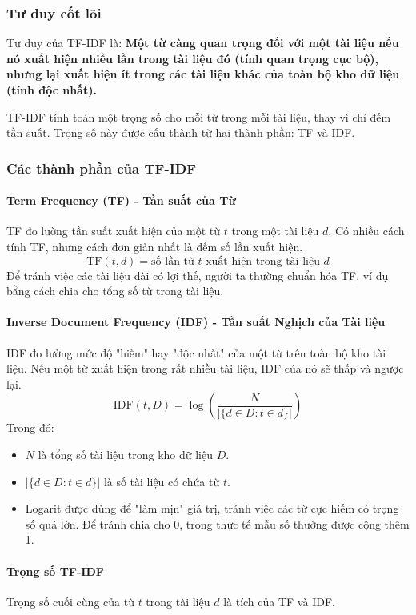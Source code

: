 \subsubsection{Tư duy cốt lõi}

Tư duy của TF-IDF là: \textbf{Một từ càng quan trọng đối với một tài liệu nếu nó xuất hiện nhiều lần trong tài liệu đó (tính quan trọng cục bộ), nhưng lại xuất hiện ít trong các tài liệu khác của toàn bộ kho dữ liệu (tính độc nhất). }

TF-IDF tính toán một trọng số cho mỗi từ trong mỗi tài liệu, thay vì chỉ đếm tần suất. Trọng số này được cấu thành từ hai thành phần: TF và IDF.

\subsubsection{Các thành phần của TF-IDF}

\paragraph{Term Frequency (TF) - Tần suất của Từ}
TF đo lường tần suất xuất hiện của một từ $t$ trong một tài liệu $d$. Có nhiều cách tính TF, nhưng cách đơn giản nhất là đếm số lần xuất hiện.
$$ \text{TF}(t, d) = \text{số lần từ } t \text{ xuất hiện trong tài liệu } d $$
Để tránh việc các tài liệu dài có lợi thế, người ta thường chuẩn hóa TF, ví dụ bằng cách chia cho tổng số từ trong tài liệu.

\paragraph{Inverse Document Frequency (IDF) - Tần suất Nghịch của Tài liệu}
IDF đo lường mức độ "hiếm" hay "độc nhất" của một từ trên toàn bộ kho tài liệu. Nếu một từ xuất hiện trong rất nhiều tài liệu, IDF của nó sẽ thấp và ngược lại.
$$ \text{IDF}(t, D) = \log\left(\frac{N}{|\{d \in D : t \in d\}|}\right) $$
Trong đó:
\begin{itemize}
    \item $N$ là tổng số tài liệu trong kho dữ liệu $D$.
    \item $|\{d \in D : t \in d\}|$ là số tài liệu có chứa từ $t$.
    \item Logarit được dùng để "làm mịn" giá trị, tránh việc các từ cực hiếm có trọng số quá lớn. Để tránh chia cho 0, trong thực tế mẫu số thường được cộng thêm 1.
\end{itemize}

\paragraph{Trọng số TF-IDF}
Trọng số cuối cùng của từ $t$ trong tài liệu $d$ là tích của TF và IDF.

